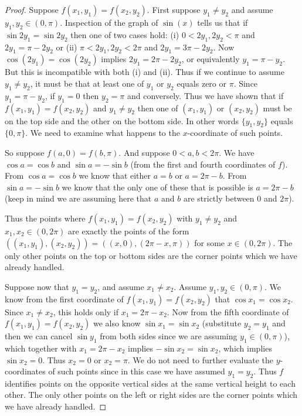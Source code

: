 \documentclass{book}
\begin{document}
\begin{enumerate}[(1)]
\begin{proof}
            \par Suppose $f(x_1,y_1)=f(x_2,y_2)$.  First suppose $y_1\not=y_2$ and assume $y_1,y_2\in(0,\pi)$. Inspection of the graph of $\sin(x)$ tells us that if $\sin 2y_1 = \sin 2y_2$ then one of two  cases hold: (i) $0<2y_1,2y_2<\pi$ and $2y_1=\pi-2y_2$ or (ii) $\pi<2y_1,2y_2<2\pi$ and $2y_1=3\pi-2y_2$.  Now $\cos(2y_1)=\cos(2y_2)$ implies $2y_1=2\pi-2y_2$, or equivalently $y_1=\pi-y_2$.  But this is incompatible with both (i) and (ii).  Thus if we continue to assume $y_1\not=y_2$, it must be that at least one of $y_1$ or $y_2$ equals zero or $\pi$.  Since $y_1=\pi-y_2$, if $y_1=0$ then $y_2=\pi$ and conversely.  Thus we have shown that if  $f(x_1,y_1)=f(x_2,y_2)$ and $y_1\not=y_2$ then one of $(x_1,y_1)$ or $(x_2,y_2)$ must be on the top side and the other on the bottom side.
            In other words $\{y_1,y_2\}$ equals $\{0,\pi\}$.  We need to examine what happens to the $x$-coordinate of such points.

            \par So suppose $f(a,0)=f(b,\pi)$.  And suppose $0<a,b<2\pi$.  We have $\cos a=\cos b$ and $\sin a = -\sin b$ (from the first and fourth coordinates of $f$). From $\cos a=\cos b$ we know that either $a=b$ or $a=2\pi-b$.  From $\sin a=-\sin b$ we know that the only one of these that is possible is $a=2\pi-b$ (keep in mind we are assuming here that $a$ and $b$ are strictly between 0 and $2\pi$).
            \par Thus the points where $f(x_1,y_1)=f(x_2,y_2)$ with $y_1\not=y_2$ and $x_1,x_2\in(0,2\pi)$ are exactly the points of the form $((x_1,y_1),(x_2,y_2))=((x,0),(2\pi-x,\pi))$ for some $x\in(0,2\pi)$.  The only other points on the top or bottom sides are the corner points which we have already handled.

            \par Suppose now that $y_1=y_2$, and assume $x_1\not=x_2$.  Assume $y_1,y_2\in(0,\pi)$.  We know from the first coordinate of $f(x_1,y_1)=f(x_2,y_2)$ that $\cos x_1=\cos x_2$.  Since $x_1\not=x_2$, this holds only if $x_1=2\pi-x_2$.  
            Now from the fifth coordinate of $f(x_1,y_1)=f(x_2,y_2)$ we also know $\sin x_1=\sin x_2$ (substitute $y_2=y_1$ and then we can cancel $\sin y_1$ from both sides since we are assuming $y_1\in(0,\pi)$), which together with $x_1=2\pi-x_2$ implies $-\sin x_2=\sin x_2$, which implies $\sin x_2=0$.  Thus $x_2=0$ or $x_2=\pi$.
            We do not need to further evaluate the $y$-coordinates of such points since in this case we have assumed $y_1=y_2$.  Thus $f$ identifies points on the opposite vertical sides at the same vertical height to each other. The only other points on the left or right sides are the corner points which we have already handled.


\end{proof}
\end{enumerate}
\end{document}
